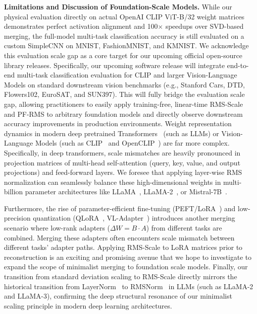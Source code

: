 \textbf{Limitations and Discussion of Foundation-Scale Models.}
While our physical evaluation directly on actual OpenAI CLIP ViT-B/32 weight matrices demonstrates perfect activation alignment and 100$\times$ speedups over SVD-based merging, the full-model multi-task classification accuracy is still evaluated on a custom SimpleCNN on MNIST, FashionMNIST, and KMNIST. We acknowledge this evaluation scale gap as a core target for our upcoming official open-source library releases. Specifically, our upcoming software release will integrate end-to-end multi-task classification evaluation for CLIP and larger Vision-Language Models on standard downstream vision benchmarks (e.g., Stanford Cars, DTD, Flowers102, EuroSAT, and SUN397). This will fully bridge the evaluation scale gap, allowing practitioners to easily apply training-free, linear-time RMS-Scale and PF-RMS to arbitrary foundation models and directly observe downstream accuracy improvements in production environments. Weight representation dynamics in modern deep pretrained Transformers~\cite{vaswani2017attention} (such as LLMs) or Vision-Language Models (such as CLIP~\cite{radford2021learning} and OpenCLIP~\cite{ilharco2021openclip}) are far more complex. Specifically, in deep transformers, scale mismatches are heavily pronounced in projection matrices of multi-head self-attention (query, key, value, and output projections) and feed-forward layers. We foresee that applying layer-wise RMS normalization can seamlessly balance these high-dimensional weights in multi-billion parameter architectures like LLaMA~\cite{touvron2023llama}, LLaMA-2~\cite{touvron2023llama2}, or Mistral-7B~\cite{jiang2023mistral}.

Furthermore, the rise of parameter-efficient fine-tuning (PEFT/LoRA~\cite{hu21lora}) and low-precision quantization (QLoRA~\cite{dettmers2024qlora}, VL-Adapter~\cite{sung2022vl}) introduces another merging scenario where low-rank adapters ($\Delta W = B \cdot A$) from different tasks are combined. Merging these adapters often encounters scale mismatch between different tasks' adapter paths. Applying RMS-Scale to LoRA matrices prior to reconstruction is an exciting and promising avenue that we hope to investigate to expand the scope of minimalist merging to foundation scale models. Finally, our transition from standard deviation scaling to RMS-Scale directly mirrors the historical transition from LayerNorm~\cite{ba2016layer} to RMSNorm~\cite{zhang2019rmsnorm} in LLMs (such as LLaMA-2 and LLaMA-3), confirming the deep structural resonance of our minimalist scaling principle in modern deep learning architectures.
